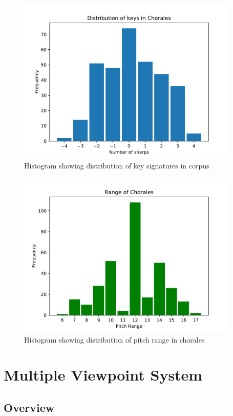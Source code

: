 \documentclass[12pt,a4paper,twoside,openright]{report}
\begin{document}
\begin{figure}[H]
\centering
\includegraphics[width=300pt]{figs/key_dist.pdf}
\caption{Histogram showing distribution of key signatures in corpus}
\label{fig:key-dist}
\end{figure}

\begin{figure}[H]
\centering
\includegraphics[width=300pt]{figs/range_dist.pdf}
\caption{Histogram showing distribution of pitch range in chorales}
\label{fig:range-dist}
\end{figure}

\section{Multiple Viewpoint System}

\subsection{Overview}
\end{document}
